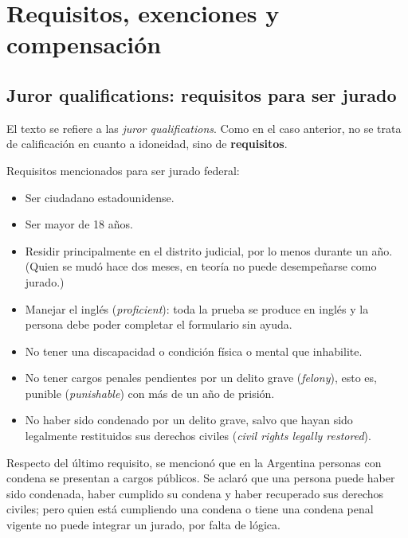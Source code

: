 \documentclass[12pt,oneside]{book}
\begin{document}
\endgroup

\chapter[Requisitos, exenciones y compensación]{Requisitos, exenciones y compensación}

\section{Juror qualifications: requisitos para ser jurado}

El texto se refiere a las \textit{juror qualifications}. Como en el caso anterior, no se trata de calificación en cuanto a idoneidad, sino de \textbf{requisitos}.

\begin{important}
Requisitos mencionados para ser jurado federal:
\begin{itemize}
\item Ser ciudadano estadounidense.
\item Ser mayor de 18 años.
\item Residir principalmente en el distrito judicial, por lo menos durante un año. (Quien se mudó hace dos meses, en teoría no puede desempeñarse como jurado.)
\item Manejar el inglés (\textit{proficient}): toda la prueba se produce en inglés y la persona debe poder completar el formulario sin ayuda.
\item No tener una discapacidad o condición física o mental que inhabilite.
\item No tener cargos penales pendientes por un delito grave (\textit{felony}), esto es, punible (\textit{punishable}) con más de un año de prisión.
\item No haber sido condenado por un delito grave, salvo que hayan sido legalmente restituidos sus derechos civiles (\textit{civil rights legally restored}).
\end{itemize}
\end{important}

Respecto del último requisito, se mencionó que en la Argentina personas con condena se presentan a cargos públicos. Se aclaró que una persona puede haber sido condenada, haber cumplido su condena y haber recuperado sus derechos civiles; pero quien está cumpliendo una condena o tiene una condena penal vigente no puede integrar un jurado, por falta de lógica.
\end{document}
